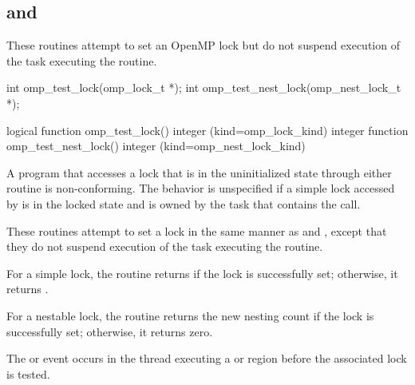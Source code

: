 \subsection{ and }
\label{subsec:omp_test_lock and omp_test_nest_lock}
\summary
These routines attempt to set an OpenMP lock but do not suspend execution of the task 
executing the routine.

\format
\begin{ccppspecific}
\begin{boxedcode}
int omp\_test\_lock(omp\_lock\_t *);
int omp\_test\_nest\_lock(omp\_nest\_lock\_t *);
\end{boxedcode}
\end{ccppspecific}

\begin{fortranspecific}
\begin{boxedcode}
logical function omp\_test\_lock()
integer (kind=omp\_lock\_kind) 
integer function omp\_test\_nest\_lock()
integer (kind=omp\_nest\_lock\_kind) 
\end{boxedcode}
\end{fortranspecific}

\constraints
A program that accesses a lock that is in the uninitialized state through either routine is 
non-conforming. The behavior is unspecified if a simple lock accessed by 
 is in the locked state and is owned by the task that contains the call.

\effect 
These routines attempt to set a lock in the same manner as  and 
, except that they do not suspend execution of the task 
executing the routine.

For a simple lock, the  routine returns  if the lock is successfully 
set; otherwise, it returns .

For a nestable lock, the  routine returns the new nesting count 
if the lock is successfully set; otherwise, it returns zero.

\events

The  or  event occurs in the thread 
executing a  or  region
before the associated lock is tested.

